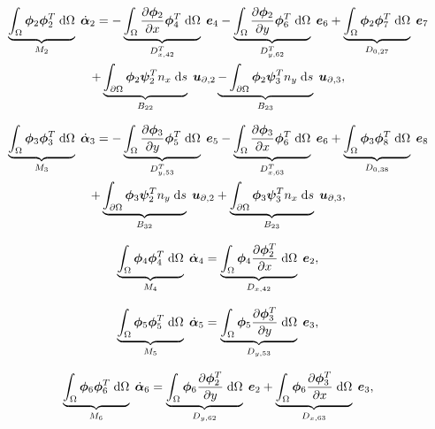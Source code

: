 \documentclass[preprint,12pt]{elsarticle}
\begin{document}
\begin{multline}
\underbrace{\int_{\Omega} \bm{\phi}_2 \bm{\phi}_2^T \d\Omega}_{M_2}  \; \dot{\bm{\alpha}}_2 =  -\underbrace{\int_{\Omega}  \diffp{\bm{\phi}_2}{x} \bm{\phi}_4^T \d\Omega}_{D_{x, 42}^T} \; \bm{e}_4 -\underbrace{\int_{\Omega}  \diffp{\bm{\phi}_2}{y} \bm{\phi}_6^T \d\Omega}_{D_{y, 62}^T} \; \bm{e}_6 +  \underbrace{\int_{\Omega}  \bm{\phi}_2 \bm{\phi}_7^T \d\Omega}_{D_{0, 27}} \; \bm{e}_7 \\
+\underbrace{\int_{\partial \Omega} \bm{\phi}_2 \bm{\psi}_2^T n_x  \d{s}}_{B_{22}} \; \bm{u}_{\partial, 2} \underbrace{-\int_{\partial \Omega} \bm{\phi}_2 \bm{\psi}_3^T n_y \d{s}}_{B_{23}} \; \bm{u}_{\partial, 3},
\end{multline}

\begin{multline}
\underbrace{\int_{\Omega} \bm{\phi}_3 \bm{\phi}_3^T \d\Omega}_{M_3} \; \dot{\bm{\alpha}}_3 =   -\underbrace{\int_{\Omega}  \diffp{\bm{\phi}_3}{y} \bm{\phi}_5^T \d\Omega}_{D_{y, 53}^T} \; \bm{e}_5 -\underbrace{\int_{\Omega}  \diffp{\bm{\phi}_3}{x} \bm{\phi}_6^T \d\Omega}_{D_{x, 63}^T} \; \bm{e}_6 + \underbrace{\int_{\Omega}  \bm{\phi}_3 \bm{\phi}_8^T \d\Omega}_{D_{0, 38}} \; \bm{e}_8 \\
+\underbrace{\int_{\partial \Omega} \bm{\phi}_3 \bm{\psi}_2^T n_y  \d{s}}_{B_{32}} \; \bm{u}_{\partial, 2} + \underbrace{\int_{\partial \Omega} \bm{\phi}_3 \bm{\psi}_3^T n_x \d{s}}_{B_{23}} \; \bm{u}_{\partial, 3},
\end{multline}

\begin{equation}
\underbrace{\int_{\Omega} \bm{\phi}_4 \bm{\phi}_4^T \d\Omega}_{M_4}  \; \dot{\bm{\alpha}}_4 =  \underbrace{\int_{\Omega} \bm{\phi}_4  \diffp{\bm{\phi}_2^T}{x}  \d\Omega}_{D_{x, 42}} \; \bm{e}_2,
\end{equation}

\begin{equation}
\underbrace{\int_{\Omega} \bm{\phi}_5 \bm{\phi}_5^T \d\Omega}_{M_5}  \; \dot{\bm{\alpha}}_5 =  \underbrace{\int_{\Omega} \bm{\phi}_5  \diffp{\bm{\phi}_3^T}{y}  \d\Omega}_{D_{y, 53}} \; \bm{e}_3,
\end{equation}

\begin{equation}
\underbrace{\int_{\Omega} \bm{\phi}_6 \bm{\phi}_6^T \d\Omega}_{M_6} \; \dot{\bm{\alpha}}_6 =  \underbrace{\int_{\Omega} \bm{\phi}_6  \diffp{\bm{\phi}_2^T}{y}  \d\Omega}_{D_{y, 62}} \; \bm{e}_2 + \underbrace{\int_{\Omega} \bm{\phi}_6  \diffp{\bm{\phi}_3^T}{x}  \d\Omega}_{D_{x, 63}} \; \bm{e}_3, 
\end{equation}
\end{document}
